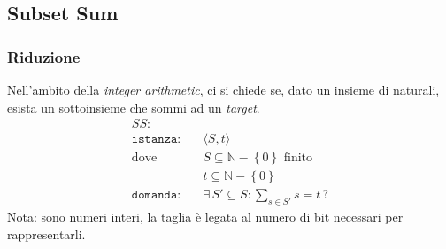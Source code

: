 \subsection{Subset Sum}
\label{sss:subsetsum}
\subsubsection{Riduzione}

Nell'ambito della \emph{integer arithmetic}, ci si chiede se, dato un insieme di naturali, esista un sottoinsieme che sommi ad un \emph{target}.
\begin{align*}
    SS: & \\
    \texttt{istanza:} \quad & \langle S,t \rangle \\
    \text{dove} \quad & S \subseteq \mathbb{N} - \left\{ 0 \right\} \text{ finito} \\
    & t \subseteq \mathbb{N} - \left\{ 0 \right\} \\
    \texttt{domanda:} \quad & \exists \, S' \subseteq S : \sum_{s \in S'}^{} s = t \, ?
\end{align*}
Nota: sono numeri interi, la taglia è legata al numero di bit necessari per rappresentarli.

